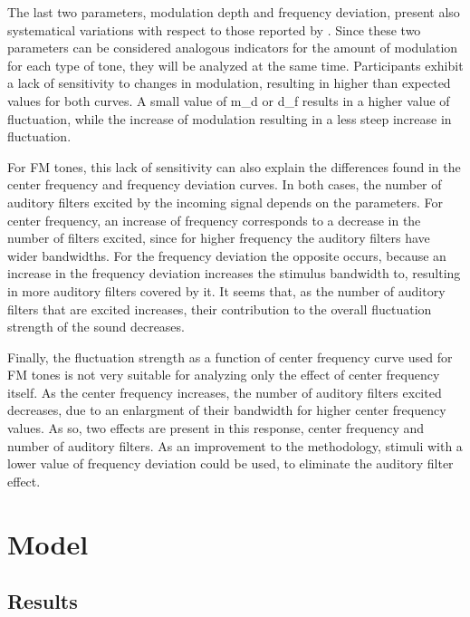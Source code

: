 \documentclass[../main.tex]{subfiles}
\begin{document}
The last two parameters, modulation depth and frequency deviation, present also
systematical variations with respect to those reported by
\citeauthor{Fastl2007Psychoacoustics}. Since these two parameters can be
considered analogous indicators for the amount of modulation for each type of
tone, they will be analyzed at the same time. Participants exhibit a lack of
sensitivity to changes in modulation, resulting in higher than expected values
for both curves. A small value of \gls{m_d} or \gls{d_f} results in a higher
value of fluctuation, while the increase of modulation resulting in a less
steep increase in fluctuation.

For \gls{FM} tones, this lack of sensitivity can also explain the differences
found in the center frequency and frequency deviation curves. In both cases,
the number of auditory filters excited by the incoming signal depends on
the parameters. For center frequency, an increase of frequency corresponds to a
decrease in the number of filters excited, since for higher frequency the
auditory filters have wider bandwidths. For the frequency deviation the opposite
occurs, because an increase in the frequency deviation increases the
stimulus bandwidth to, resulting in more auditory filters covered by it. It
seems that, as the number of auditory filters that are excited increases, their
contribution to the overall fluctuation strength of the sound decreases.

Finally, the fluctuation strength as a function of center frequency curve used
for \gls{FM} tones is not very suitable for analyzing only the effect of center
frequency itself. As the center frequency increases, the number of auditory
filters excited decreases, due to an enlargment of their bandwidth for higher
center frequency values. As so, two effects are present in this response, center
frequency and number of auditory filters. As an improvement to the methodology,
stimuli with a lower value of frequency deviation could be used, to eliminate
the auditory filter effect.

\section{Model}

\subsection{Results}
\end{document}
